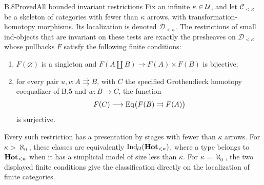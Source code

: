 \begin{claim}{B.8}{Proved}{All bounded invariant restrictions}
Fix an infinite $\kappa\in\mathcal U$, and let $\mathcal C_{<\kappa}$ be a skeleton of categories with fewer than $\kappa$ arrows, with transformation-homotopy morphisms. Its localization is denoted $\mathcal D_{<\kappa}$. The restrictions of small ind-objects that are invariant on these tests are exactly the presheaves on $\mathcal D_{<\kappa}$ whose pullbacks $F$ satisfy the following finite conditions:
\begin{enumerate}[label=(\roman*)]
\item $F(\varnothing)$ is a singleton and $F(A\amalg B)\to F(A)\times F(B)$ is bijective;
\item for every pair $u,v:A\rightrightarrows B$, with $C$ the specified Grothendieck homotopy coequalizer of B.5 and $w:B\to C$, the function
\[
 F(C)\longrightarrow\operatorname{Eq}\bigl(F(B)\rightrightarrows F(A)\bigr)
\]
is surjective.
\end{enumerate}
Every such restriction has a presentation by stages with fewer than $\kappa$ arrows. For $\kappa>\aleph_0$, these classes are equivalently $\operatorname{Ind}_\mathcal U(\mathbf{Hot}_{<\kappa})$, where a type belongs to $\mathbf{Hot}_{<\kappa}$ when it has a simplicial model of size less than $\kappa$. For $\kappa=\aleph_0$, the two displayed finite conditions give the classification directly on the localization of finite categories.
\end{claim}
